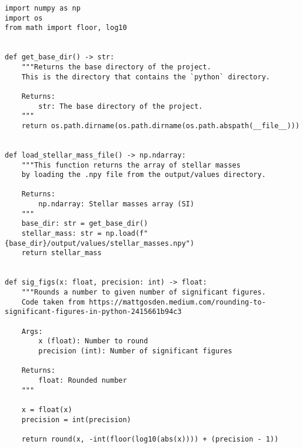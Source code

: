 \begin{lstlisting}
import numpy as np
import os
from math import floor, log10


def get_base_dir() -> str:
    """Returns the base directory of the project.
    This is the directory that contains the `python` directory.

    Returns:
        str: The base directory of the project.
    """
    return os.path.dirname(os.path.dirname(os.path.abspath(__file__)))


def load_stellar_mass_file() -> np.ndarray:
    """This function returns the array of stellar masses
    by loading the .npy file from the output/values directory.

    Returns:
        np.ndarray: Stellar masses array (SI)
    """
    base_dir: str = get_base_dir()
    stellar_mass: str = np.load(f"{base_dir}/output/values/stellar_masses.npy")
    return stellar_mass


def sig_figs(x: float, precision: int) -> float:
    """Rounds a number to given number of significant figures.
    Code taken from https://mattgosden.medium.com/rounding-to-significant-figures-in-python-2415661b94c3

    Args:
        x (float): Number to round
        precision (int): Number of significant figures

    Returns:
        float: Rounded number
    """

    x = float(x)
    precision = int(precision)

    return round(x, -int(floor(log10(abs(x)))) + (precision - 1))
\end{lstlisting}